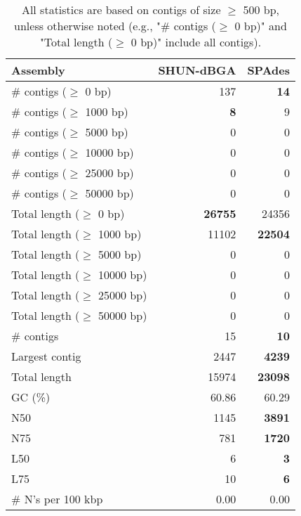 \documentclass[12pt,a4paper]{article}
\begin{document}
\begin{table}[ht]
\begin{center}
\caption{All statistics are based on contigs of size $\geq$ 500 bp, unless otherwise noted (e.g., "\# contigs ($\geq$ 0 bp)" and "Total length ($\geq$ 0 bp)" include all contigs).}
\begin{tabular}{|l*{2}{|r}|}
\hline
Assembly & SHUN-dBGA & SPAdes \\ \hline
\# contigs ($\geq$ 0 bp) & 137 & {\bf 14} \\ \hline
\# contigs ($\geq$ 1000 bp) & {\bf 8} & 9 \\ \hline
\# contigs ($\geq$ 5000 bp) & 0 & 0 \\ \hline
\# contigs ($\geq$ 10000 bp) & 0 & 0 \\ \hline
\# contigs ($\geq$ 25000 bp) & 0 & 0 \\ \hline
\# contigs ($\geq$ 50000 bp) & 0 & 0 \\ \hline
Total length ($\geq$ 0 bp) & {\bf 26755} & 24356 \\ \hline
Total length ($\geq$ 1000 bp) & 11102 & {\bf 22504} \\ \hline
Total length ($\geq$ 5000 bp) & 0 & 0 \\ \hline
Total length ($\geq$ 10000 bp) & 0 & 0 \\ \hline
Total length ($\geq$ 25000 bp) & 0 & 0 \\ \hline
Total length ($\geq$ 50000 bp) & 0 & 0 \\ \hline
\# contigs & 15 & {\bf 10} \\ \hline
Largest contig & 2447 & {\bf 4239} \\ \hline
Total length & 15974 & {\bf 23098} \\ \hline
GC (\%) & 60.86 & 60.29 \\ \hline
N50 & 1145 & {\bf 3891} \\ \hline
N75 & 781 & {\bf 1720} \\ \hline
L50 & 6 & {\bf 3} \\ \hline
L75 & 10 & {\bf 6} \\ \hline
\# N's per 100 kbp & 0.00 & 0.00 \\ \hline
\end{tabular}
\end{center}
\end{table}
\end{document}
